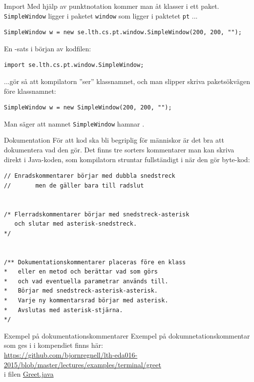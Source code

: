 \documentclass{lecturenotes}
\begin{document}
\begin{Slide}{Import}\footnotesize
Med hjälp av punktnotation kommer man åt klasser i ett paket.\\
\texttt{SimpleWindow} ligger i paketet \texttt{window} som ligger i paktetet \texttt{pt} ... 
\begin{lstlisting}
SimpleWindow w = new se.lth.cs.pt.window.SimpleWindow(200, 200, "");
\end{lstlisting}
En -sats i början av kodfilen: 
\begin{lstlisting}
import se.lth.cs.pt.window.SimpleWindow;
\end{lstlisting}

...gör så att kompilatorn ''ser'' klassnamnet, och man slipper skriva paketsökvägen före klassnamnet:
\begin{lstlisting}
SimpleWindow w = new SimpleWindow(200, 200, "");
\end{lstlisting}
Man säger att namnet \texttt{SimpleWindow} hamnar .
\end{Slide}

\begin{Slide}{Dokumentation}\footnotesize
För att kod ska bli begriplig för människor är det bra att dokumentera vad den gör. Det finns tre sorters kommentarer man kan skriva direkt i Java-koden, som kompilatorn struntar fullständigt i när den gör byte-kod:
\begin{lstlisting}
// Enradskommentarer börjar med dubbla snedstreck
//       men de gäller bara till radslut


/* Flerradskommentarer börjar med snedstreck-asterisk
   och slutar med asterisk-snedstreck.
*/ 


/** Dokumentationskommentarer placeras före en klass
*   eller en metod och berättar vad som görs
*   och vad eventuella parametrar används till.
*   Börjar med snedstreck-asterisk-asterisk.
*   Varje ny kommentarsrad börjar med asterisk.
*   Avslutas med asterisk-stjärna.
*/
\end{lstlisting}
\end{Slide}

\begin{Slide}{Exempel på dokumentationskommentarer}
Exempel på dokumnetationskommentar som ges i  i kompendiet finns här:\\ 
\href{https://github.com/bjornregnell/lth-eda016-2015/blob/master/lectures/examples/terminal/greet/Greet.java}{https://github.com/bjornregnell/lth-eda016-2015/blob/master/lectures/examples/terminal/greet} \\
i filen \href{https://raw.githubusercontent.com/bjornregnell/lth-eda016-2015/master/lectures/examples/terminal/greet/Greet.java}{Greet.java}
\end{Slide}
\end{document}
